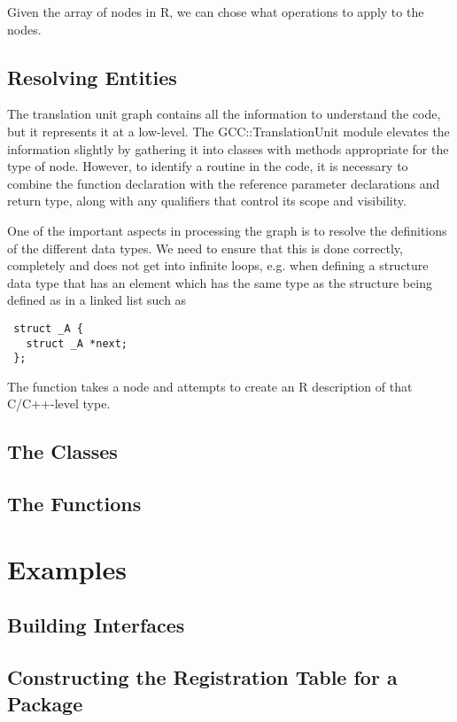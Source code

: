 \documentclass{article}
\begin{document}
Given the array of nodes in R, we can chose what operations to
apply to the nodes.


\subsection{Resolving Entities}
The translation unit graph contains all the information
to understand the code, but it represents it at a low-level.
The GCC::TranslationUnit module elevates the information slightly
by gathering it into classes with methods appropriate for the type
of node.
However, to identify a routine in the code, it is necessary
to combine the function declaration with the
reference parameter declarations and return type,
along with any qualifiers that control its scope and
visibility.

One of the important aspects in processing the graph
is to resolve the definitions of the different data types.
We need to ensure that this is done correctly,
completely and does not get into infinite loops,
e.g. when defining a structure data type that has an element
which has the same type as the structure being defined
as in a linked list such as
\begin{verbatim}
 struct _A {
   struct _A *next;
 };
\end{verbatim}


The function  takes a node and
attempts to create an R description of that
C/C++-level type.



\subsection{The Classes}

\subsection{The Functions}



\section{Examples}

\subsection{Building Interfaces}

\subsection{Constructing the Registration Table for a Package}
\end{document}
